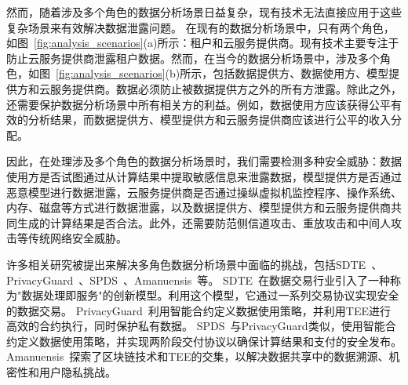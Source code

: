 然而，随着涉及多个角色的数据分析场景日益复杂，现有技术无法直接应用于这些复杂场景来有效解决数据泄露问题。
在现有的数据分析场景中，只有两个角色，如图~\ref{fig:analysis_scenarios}(a)所示：租户和云服务提供商。现有技术主要专注于防止云服务提供商泄露租户数据。然而，在当今的数据分析场景中，涉及多个角色，如图~\ref{fig:analysis_scenarios}(b)所示，包括数据提供方、数据使用方、模型提供方和云服务提供商。数据必须防止被数据提供方之外的所有方泄露。除此之外，还需要保护数据分析场景中所有相关方的利益。例如，数据使用方应该获得公平有效的分析结果，而数据提供方、模型提供方和云服务提供商应该进行公平的收入分配。

因此，在处理涉及多个角色的数据分析场景时，我们需要检测多种安全威胁：数据使用方是否试图通过从计算结果中提取敏感信息来泄露数据，模型提供方是否通过恶意模型进行数据泄露，云服务提供商是否通过操纵虚拟机监控程序、操作系统、内存、磁盘等方式进行数据泄露，以及数据提供方、模型提供方和云服务提供商共同生成的计算结果是否合法。此外，还需要防范侧信道攻击、重放攻击和中间人攻击等传统网络安全威胁。

许多相关研究被提出来解决多角色数据分析场景中面临的挑战，包括SDTE~\cite{dai2019sdte}、PrivacyGuard~\cite{xiao2020privacyguard}、SPDS~\cite{wang2020spds}、Amanuensis~\cite{hardin2022amanuensis}等。
SDTE~\cite{dai2019sdte}在数据交易行业引入了一种称为"数据处理即服务"的创新模型。利用这个模型，它通过一系列交易协议实现安全的数据交易。
PrivacyGuard~\cite{xiao2020privacyguard}利用智能合约定义数据使用策略，并利用TEE进行高效的合约执行，同时保护私有数据。
SPDS~\cite{wang2020spds}与PrivacyGuard类似，使用智能合约定义数据使用策略，并实现两阶段交付协议以确保计算结果和支付的安全发布。
Amanuensis~\cite{hardin2022amanuensis}探索了区块链技术和TEE的交集，以解决数据共享中的数据溯源、机密性和用户隐私挑战。

